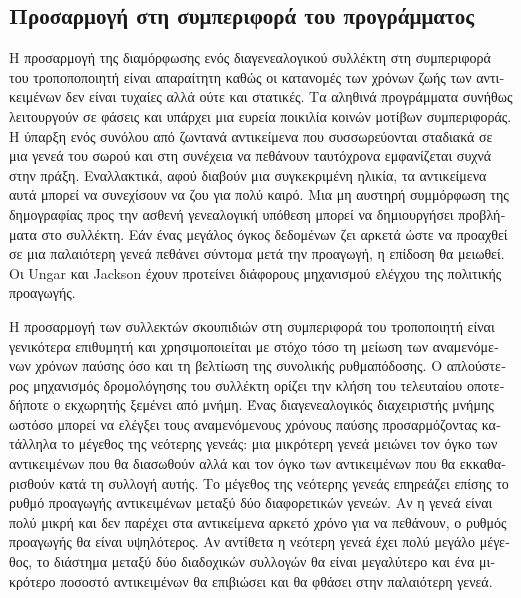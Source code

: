 \begin{greek}
\section{Προσαρμογή στη συμπεριφορά του προγράμματος}
Η προσαρμογή της διαμόρφωσης ενός διαγενεαλογικού συλλέκτη στη
συμπεριφορά του τροποποποιητή είναι απαραίτητη καθώς οι κατανομές
των χρόνων ζωής των αντικειμένων δεν είναι τυχαίες αλλά ούτε
και στατικές. Τα αληθινά προγράμματα συνήθως λειτουργούν σε φάσεις
και υπάρχει μια ευρεία ποικιλία κοινών μοτίβων συμπεριφοράς.
Η ύπαρξη ενός συνόλου από ζωντανά αντικείμενα που συσσωρεύονται
σταδιακά σε μια γενεά του σωρού και στη συνέχεια να πεθάνουν
ταυτόχρονα εμφανίζεται συχνά στην πράξη. Εναλλακτικά, αφού
διαβούν μια συγκεκριμένη ηλικία, τα αντικείμενα αυτά μπορεί
να συνεχίσουν να ζου για πολύ καιρό. Μια μη αυστηρή συμμόρφωση
της δημογραφίας προς την ασθενή γενεαλογική υπόθεση μπορεί να
δημιουργήσει προβλήματα στο συλλέκτη. Εάν ένας μεγάλος όγκος
δεδομένων ζει αρκετά ώστε να προαχθεί σε μια παλαιότερη γενεά
πεθάνει σύντομα μετά την προαγωγή, η επίδοση θα μειωθεί.
Οι Ungar και Jackson \cite{DBLP:conf/oopsla/UngarJ88, DBLP:journals/toplas/UngarJ92}
έχουν προτείνει διάφορους μηχανισμού ελέγχου της πολιτικής
προαγωγής.

Η προσαρμογή των συλλεκτών σκουπιδιών στη συμπεριφορά του
τροποποιητή είναι γενικότερα επιθυμητή και χρησιμοποιείται
με στόχο τόσο τη μείωση των αναμενόμενων χρόνων παύσης όσο
και τη βελτίωση της συνολικής ρυθμαπόδοσης. Ο απλούστερος μηχανισμός
δρομολόγησης του συλλέκτη ορίζει την κλήση του τελευταίου
οποτεδήποτε ο εκχωρητής ξεμένει από μνήμη. Ένας διαγενεαλογικός
διαχειριστής μνήμης ωστόσο μπορεί να ελέγξει τους αναμενόμενους
χρόνους παύσης προσαρμόζοντας κατάλληλα το μέγεθος της νεότερης
γενεάς: μια μικρότερη γενεά μειώνει τον όγκο των αντικειμένων
που θα διασωθούν αλλά και τον όγκο των αντικειμένων που θα εκκαθαρισθούν
κατά τη συλλογή αυτής. Το μέγεθος της νεότερης γενεάς επηρεάζει
επίσης το ρυθμό προαγωγής αντικειμένων μεταξύ δύο διαφορετικών
γενεών. Αν η γενεά είναι πολύ μικρή και δεν παρέχει στα αντικείμενα
αρκετό χρόνο για να πεθάνουν, ο ρυθμός προαγωγής θα είναι υψηλότερος.
Αν αντίθετα η νεότερη γενεά έχει πολύ μεγάλο μέγεθος, το διάστημα
μεταξύ δύο διαδοχικών συλλογών θα είναι μεγαλύτερο και ένα
μικρότερο ποσοστό αντικειμένων θα επιβιώσει και θα φθάσει στην
παλαιότερη γενεά.


\end{greek}
